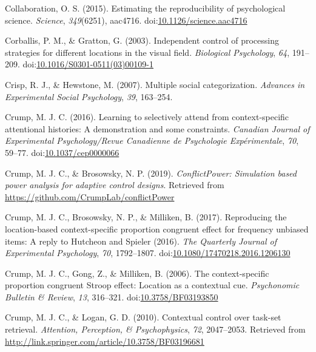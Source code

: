 \documentclass[english,,man,floatsintext]{apa6}
\begin{document}
\leavevmode\hypertarget{ref-open_science_collaboration_estimating_2015}{}%
Collaboration, O. S. (2015). Estimating the reproducibility of psychological science. \emph{Science}, \emph{349}(6251), aac4716. doi:\href{https://doi.org/10.1126/science.aac4716}{10.1126/science.aac4716}

\leavevmode\hypertarget{ref-corballis_independent_2003}{}%
Corballis, P. M., \& Gratton, G. (2003). Independent control of processing strategies for different locations in the visual field. \emph{Biological Psychology}, \emph{64}, 191--209. doi:\href{https://doi.org/10.1016/S0301-0511(03)00109-1}{10.1016/S0301-0511(03)00109-1}

\leavevmode\hypertarget{ref-crisp_multiple_2007}{}%
Crisp, R. J., \& Hewstone, M. (2007). Multiple social categorization. \emph{Advances in Experimental Social Psychology}, \emph{39}, 163--254.

\leavevmode\hypertarget{ref-crump_learning_2016}{}%
Crump, M. J. C. (2016). Learning to selectively attend from context-specific attentional histories: A demonstration and some constraints. \emph{Canadian Journal of Experimental Psychology/Revue Canadienne de Psychologie Expérimentale}, \emph{70}, 59--77. doi:\href{https://doi.org/10.1037/cep0000066}{10.1037/cep0000066}

\leavevmode\hypertarget{ref-r_conflictPower_2019}{}%
Crump, M. J. C., \& Brosowsky, N. P. (2019). \emph{ConflictPower: Simulation based power analysis for adaptive control designs}. Retrieved from \url{https://github.com/CrumpLab/conflictPower}

\leavevmode\hypertarget{ref-crump_reproducing_2017}{}%
Crump, M. J. C., Brosowsky, N. P., \& Milliken, B. (2017). Reproducing the location-based context-specific proportion congruent effect for frequency unbiased items: A reply to Hutcheon and Spieler (2016). \emph{The Quarterly Journal of Experimental Psychology}, \emph{70}, 1792--1807. doi:\href{https://doi.org/10.1080/17470218.2016.1206130}{10.1080/17470218.2016.1206130}

\leavevmode\hypertarget{ref-crump_context-specific_2006}{}%
Crump, M. J. C., Gong, Z., \& Milliken, B. (2006). The context-specific proportion congruent Stroop effect: Location as a contextual cue. \emph{Psychonomic Bulletin \& Review}, \emph{13}, 316--321. doi:\href{https://doi.org/10.3758/BF03193850}{10.3758/BF03193850}

\leavevmode\hypertarget{ref-crump_contextual_2010}{}%
Crump, M. J. C., \& Logan, G. D. (2010). Contextual control over task-set retrieval. \emph{Attention, Perception, \& Psychophysics}, \emph{72}, 2047--2053. Retrieved from \url{http://link.springer.com/article/10.3758/BF03196681}
\end{document}
